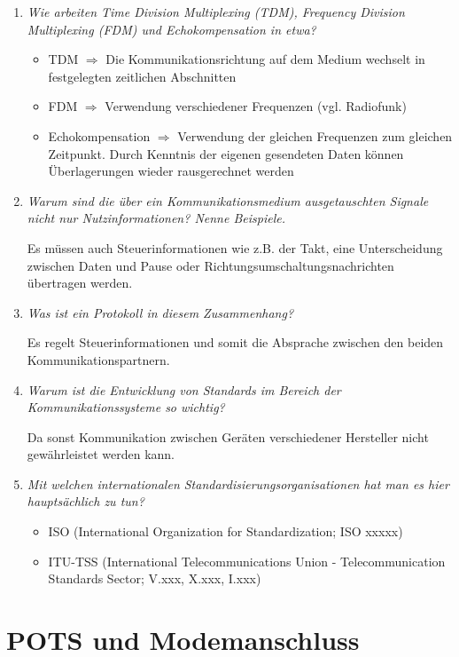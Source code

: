 \documentclass[hidelinks]{article}
\begin{document}
\begin{enumerate}
\item \textit{Wie arbeiten Time Division Multiplexing (TDM), Frequency Division Multiplexing (FDM) und Echokompensation in etwa?}

\begin{itemize}
\item TDM $\Rightarrow$ Die Kommunikationsrichtung auf dem Medium wechselt in festgelegten zeitlichen Abschnitten
\item FDM $\Rightarrow$ Verwendung verschiedener Frequenzen (vgl. Radiofunk)
\item Echokompensation $\Rightarrow$ Verwendung der gleichen Frequenzen zum gleichen Zeitpunkt. Durch Kenntnis der eigenen gesendeten Daten können Überlagerungen wieder rausgerechnet werden
\end{itemize}

\item \textit{Warum sind die über ein Kommunikationsmedium ausgetauschten Signale nicht nur Nutzinformationen? Nenne Beispiele.}

Es müssen auch Steuerinformationen wie z.B. der Takt, eine Unterscheidung zwischen Daten und Pause oder Richtungsumschaltungsnachrichten übertragen werden.\\

\item \textit{Was ist ein Protokoll in diesem Zusammenhang?}

Es regelt Steuerinformationen und somit die Absprache zwischen den beiden Kommunikationspartnern.

\item \textit{Warum ist die Entwicklung von Standards im Bereich der Kommunikationssysteme so wichtig?}

Da sonst Kommunikation zwischen Geräten verschiedener Hersteller nicht gewährleistet werden kann.

\item \textit{Mit welchen internationalen Standardisierungsorganisationen hat man es hier hauptsächlich zu tun?}

\begin{itemize}
\item ISO (International Organization for Standardization; ISO xxxxx)
\item ITU-TSS (International Telecommunications Union - Telecommunication Standards Sector; V.xxx, X.xxx, I.xxx)
\end{itemize}
\end{enumerate}
\section{POTS und Modemanschluss}
\end{document}
